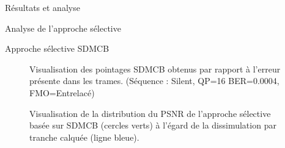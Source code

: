 \begin{chapter}{Résultats et analyse}
\begin{section}{Analyse de l'approche sélective}
\begin{subsection}{Approche sélective SDMCB}
\begin{figure}[htb]
{\begin{varwidth}{\textwidth}
{\label{fig-SilentDispFcPerfDiff}
}
\end{varwidth}} 
\caption[Pointages SDMCB obtenus par rapport à l'erreur (entrelacé)]
{Visualisation des pointages SDMCB obtenus par rapport à l'erreur présente dans
les trames. (Séquence : Silent, QP=16 BER=0.0004, FMO=Entrelacé)}
\label{fig-SilentDisp}
\end{figure}

\begin{figure}[htb]
\caption[PSNR de l'approche sélective basée sur SDMCB]{Visualisation de la
distribution du PSNR de l'approche sélective basée sur SDMCB (cercles verts) à l'égard de la dissimulation par tranche calquée (ligne
bleue).}
\label{fig-SelectiveSliceCopy}
\end{figure}


\end{subsection}
\end{section}
\end{chapter}
